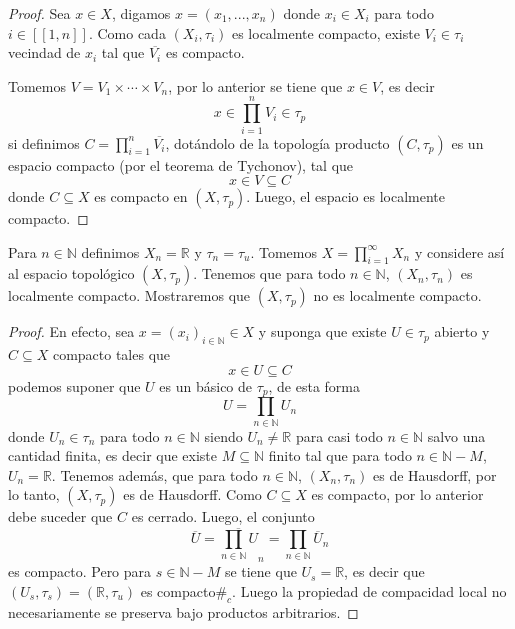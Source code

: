 \documentclass[12pt]{report}
\theoremstyle{largebreak}
\newcommand\contradiction{\ensuremath{\#_c}}
\newcommand{\Cls}[1]{\ensuremath{\overline{#1}}}
\newcommand{\natint}[1]{\ensuremath{\left[\!\left[#1\right]\!\right]}}
\begin{document}
    \begin{proof}
        Sea $x\in X$, digamos $x=(x_1,...,x_n)$ donde $x_i\in X_i$ para todo $i\in\natint{1,n}$. Como cada $(X_i,\tau_i)$ es localmente compacto, existe $V_i\in\tau_i$ vecindad de $x_i$ tal que $\Cls{V_i}$ es compacto.
        
        Tomemos $V=V_1\times\cdots\times V_n$, por lo anterior se tiene que $x\in V$, es decir
        \begin{equation*}
            x\in \prod_{ i=1}^n V_i\in\tau_p
        \end{equation*}
        si definimos $C=\prod_{ i=1}^n \Cls{V_i}$, dotándolo de la topología producto $(C,\tau_p)$ es un espacio compacto (por el teorema de Tychonov), tal que
        \begin{equation*}
            x\in V\subseteq C
        \end{equation*}
        donde $C\subseteq X$ es compacto en $(X,\tau_p)$. Luego, el espacio es localmente compacto.
    \end{proof}

    \begin{exa}
        Para $n\in\mathbb{N}$ definimos $X_n=\mathbb{R}$ y $\tau_n=\tau_u$. Tomemos $X=\prod_{ i=1}^\infty X_n$ y considere así al espacio topológico $(X,\tau_p)$. Tenemos que para todo $n\in\mathbb{N}$, $(X_n,\tau_n)$ es localmente compacto. Mostraremos que $(X,\tau_p)$ no es localmente compacto.
    \end{exa}

    \begin{proof}
        En efecto, sea $x=\left(x_i \right)_{ i\in\mathbb{N}}\in X$ y suponga que existe $U\in\tau_p$ abierto y $C\subseteq X$ compacto tales que
        \begin{equation*}
            x\in U\subseteq C
        \end{equation*}
        podemos suponer que $U$ es un básico de $\tau_p$, de esta forma
        \begin{equation*}
            U=\prod_{ n\in\mathbb{N}}U_n
        \end{equation*}
        donde $U_n\in\tau_n$ para todo $n\in\mathbb{N}$ siendo $U_n\neq\mathbb{R}$ para casi todo $n\in\mathbb{N}$ salvo una cantidad finita, es decir que existe $M\subseteq \mathbb{N}$ finito tal que para todo $n\in\mathbb{N}-M$, $U_n=\mathbb{R}$. Tenemos además, que para todo $n\in\mathbb{N}$, $(X_n,\tau_n)$ es de Hausdorff, por lo tanto, $(X,\tau_p)$ es de Hausdorff. Como $C\subseteq X$ es compacto, por lo anterior debe suceder que $C$ es cerrado. Luego, el conjunto
        \begin{equation*}
            \Cls{U}=\Cls{\prod_{ n\in\mathbb{N}}U}_n=\prod_{ n\in\mathbb{N}}\Cls{U}_n
        \end{equation*}
        es compacto. Pero para $s\in\mathbb{N}-M$ se tiene que $U_s=\mathbb{R}$, es decir que $(U_s,\tau_s)=(\mathbb{R},\tau_u)$ es compacto\contradiction. Luego la propiedad de compacidad local no necesariamente se preserva bajo productos arbitrarios.
    \end{proof}
\end{document}
